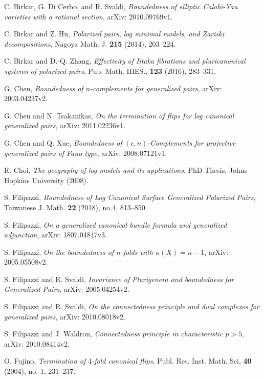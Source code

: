 \documentclass[11pt]{amsart}
\numberwithin{equation}{section}
\theoremstyle{definition}
\theoremstyle{definition}
\theoremstyle{definition}
\begin{document}
\begin{thebibliography}{99}
 C. Birkar, G. Di Cerbo, and R. Svaldi, \textit{Boundedness of elliptic Calabi-Yau varieties with a rational section}, arXiv: 2010.09769v1.

 C. Birkar and Z. Hu, \textit{Polarized pairs, log minimal models, and Zariski decompositions}, Nagoya Math. J. \textbf{215} (2014), 203--224.

 C. Birkar and D.-Q. Zhang, \textit{Effectivity of Iitaka fibrations and pluricanonical systems of polarized pairs}, Pub. Math. IHES., \textbf{123} (2016), 283--331.

 G. Chen, \textit{Boundedness of $n$-complements for generalized pairs}, arXiv: 2003.04237v2.

 G. Chen and N. Tsakanikas, \textit{On the termination of flips for log canonical generalized pairs}, arXiv: 2011.02236v1.

 G. Chen and Q. Xue, \textit{Boundedness of $(\epsilon,n)$-Complements for projective generalized pairs of Fano type}, arXiv: 2008.07121v1.

 R. Choi, \textit{The geography of log models and its applications}, PhD Thesis, Johns Hopkins University (2008).

 S. Filipazzi, \textit{Boundedness of Log Canonical Surface Generalized Polarized Pairs}, Taiwanese J. Math. \textbf{22} (2018), no.4, 813--850.

 S. Filipazzi, \textit{On a generalized canonical bundle formula and generalized adjunction}, arXiv: 1807.04847v3.


 S. Filipazzi, \textit{On the boundedness of $n$-folds with $\kappa(X)=n-1$}, arXiv: 2005.05508v2. 

 S. Filipazzi and R. Svaldi, \textit{Invariance of Plurigenera and boundedness for Generalized Pairs}, arXiv: 2005.04254v2.

 S. Filipazzi and R. Svaldi, \textit{On the connectedness principle and dual complexes for generalized pairs}, arXiv: 2010.08018v2.

 S. Filipazzi and J. Waldron, \textit{Connectedness principle in characteristic $p>5$}, arXiv: 2010.08414v2.

 O. Fujino, \textit{Termination of $4$-fold canonical flips}, Publ. Res. Inst. Math. Sci, \textbf{40} (2004), no. 1, 231--237.


\end{thebibliography}
\end{document}
